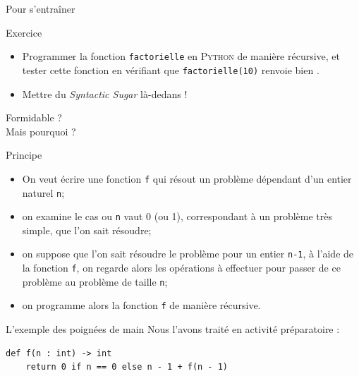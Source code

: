 \documentclass[10pt]{nsibeamer}
\begin{document}
%

\begin{frame}{Pour s'entraîner}
    \begin{alertblock}{Exercice}
        \begin{itemize}
            \item   Programmer la fonction \texttt{factorielle} en \textsc{Python} de manière récursive, et tester cette fonction en vérifiant que  \texttt{factorielle(10)} renvoie bien .
            \item   Mettre du \textit{Syntactic Sugar} là-dedans !
        \end{itemize}
    \end{alertblock}
\end{frame}

\begin{frame}[standout]
    \begin{center}
        \Huge
        Formidable ?\\
        Mais pourquoi ?
    \end{center}
\end{frame}

%

\begin{frame}{Principe}
    \begin{itemize}
        \item   On veut écrire une fonction \texttt{f} qui résout un problème dépendant d'un entier naturel \texttt{n};\pause
        \item   on examine le cas ou \texttt{n} vaut 0 (ou 1), correspondant à un problème très simple, que l'on sait résoudre;\pause
        \item   on suppose que l'on sait résoudre le problème pour un entier \texttt{n-1}, à l'aide de la fonction \texttt{f}, on regarde alors les opérations à effectuer pour passer de ce problème au problème de taille \texttt{n};\pause
        \item   on programme alors la fonction \texttt{f} de manière récursive.
    \end{itemize}
\end{frame}

%

\begin{frame}[fragile]{L'exemple des poignées de main}
    \pause
    Nous l'avons traité en activité préparatoire :
    \pause
    \begin{verbatim}
def f(n : int) -> int
    return 0 if n == 0 else n - 1 + f(n - 1)
\end{verbatim}
\end{frame}
\end{document}
